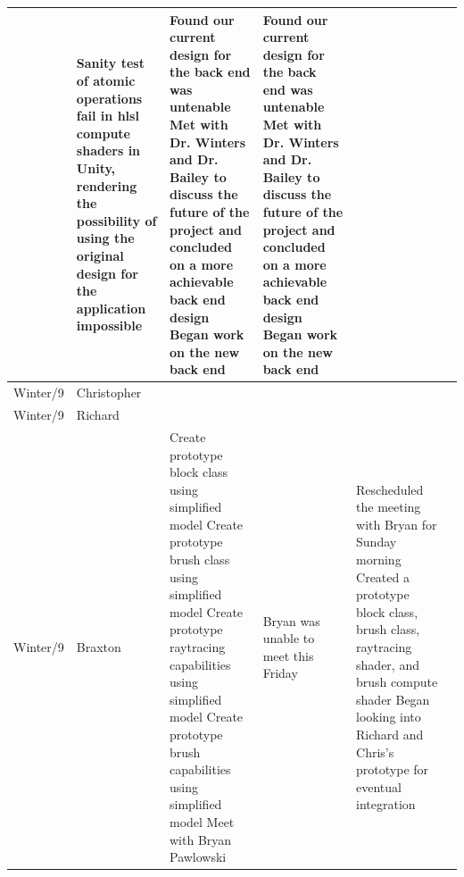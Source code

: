 \documentclass[onecolumn, draftclsnofoot,10pt, compsoc]{IEEEtran}
\begin{document}
\begin{tiny}
\begin{longtable}{ | p{} | p{} | p{} | p{} | p{} | p{} | }
&

Sanity test of atomic operations fail in hlsl compute shaders in Unity, rendering the possibility of using the original design for the application impossible 

&

Found our current design for the back end was untenable \newline
Met with Dr. Winters and Dr. Bailey to discuss the future of the project and concluded on a more achievable back end design \newline
Began work on the new back end 

&

Found our current design for the back end was untenable \newline
Met with Dr. Winters and Dr. Bailey to discuss the future of the project and concluded on a more achievable back end design \newline
Began work on the new back end 

\\ \hline
Winter/9 & Christopher & 

&

&

&

\\ \hline
Winter/9 & Richard & 

&

&

&

\\ \hline
Winter/9 & Braxton & 

Create prototype block class using simplified model \newline
Create prototype brush class using simplified model \newline
Create prototype raytracing capabilities using simplified model \newline
Create prototype brush capabilities using simplified model \newline
Meet with Bryan Pawlowski 

&

Bryan was unable to meet this Friday 

&

Rescheduled the meeting with Bryan for Sunday morning \newline
Created a prototype block class, brush class, raytracing shader, and brush compute shader \newline
Began looking into Richard and Chris's prototype for eventual integration 


\end{longtable}
\end{tiny}
\end{document}
